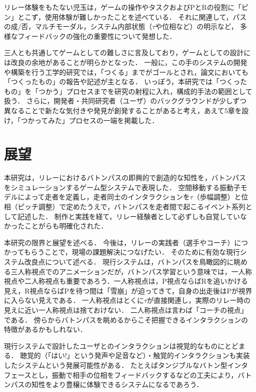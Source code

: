 \documentclass{jsai2e}
\newif\ifshowlabels
\newcommand{\tagtext}[3]{%
  \ifshowlabels
    \textcolor{#1}{#3\textsuperscript{\textsf{[#2]}}}%
  \else
    #3%
  \fi
}
\newcommand{\fix}[2]{\tagtext{fixred}{#1}{#2}}
\begin{document}
\fix{}{
リレー体験をもたない児玉は，ゲームの操作やタスクおよびPとRの役割に「ピン」とこず，使用体験が難しかったことを述べている．
それに関連して，パスの成/否，マルチモーダル，システム内部状態（$\tau$や位相など）の明示など，
多様なフィードバックの強化の重要性について発想した．
}

\fix{}{
三人とも共通してゲームとしての難しさに言及しており，ゲームとしての設計には改良の余地があることが明らかとなった．
一般に，この手のシステムの開発や構築を行う工学的研究では，「つくる」までがゴールとされ，論文においても「つくったもの」の報告や記述が主となる．
いっぽう，本研究では「つくったもの」を「つかう」プロセスまでを研究の射程に入れ，構成的手法の範囲として扱う．
さらに，開発者・共同研究者（ユーザ）のバックグラウンドが少しずつ異なることで新たな気付きや発見が創発することがあると考え，あえて5章を設け，「つかってみた」プロセスの一端を掲載した．
}

\fix{}{
\section{展望}
}

\fix{}{
本研究は，リレーにおけるバトンパスの即興的で創造的な知性を，バトンパスをシミュレーションするゲーム型システムで表現した．
空間移動する振動子モデルによって走者を定義し，走者同士のインタラクションを$\tau$（歩幅調整）と位相（ピッチ調整）で定めたうえで，バトンパスを走者間で起こるイベント系列として記述した．
制作と実践を経て，リレー経験者として必ずしも自覚していなかったことがらも明確化された．
}


\fix{}{
本研究の限界と展望を述べる．
今後は，リレーの実践者（選手やコーチ）につかってもらうことで，現場の課題解決につなげたい．
そのために有効な現行システム改良点について述べる．
現行システムは，バトンパスを鳥瞰図的に眺める三人称視点でのアニメーションだが，バトンパス学習という意味では，一人称視点や二人称視点も重要であろう．一人称視点は，P視点ならばRを追いかける見え，R視点ならばPを待つ間は「雪崩」が迫ってきて，自身の出走後はPが視界に入らない見えである．
一人称視点はとくに$\tau$が直接関連し，実際のリレー時の見えに近い一人称視点は捨ておけない．
二人称視点は言わば「コーチの視点」である．
傍らからバトンパスを眺めるからこそ把握できるインタラクションの特徴があるかもしれない．
}

\fix{}{
現行システムで設計したユーザとのインタラクションは視覚的なものにとどまる．
聴覚的（「はい!」という発声や足音など）・触覚的インタラクションも実装したシステムという発展可能性がある．
たとえばタンジブルなバトン型インタフェースとし，振動で相手の位相をフィードバックするなどの工夫により，バトンパスの知性をより豊穣に体験できるシステムになるであろう．
}
\end{document}
